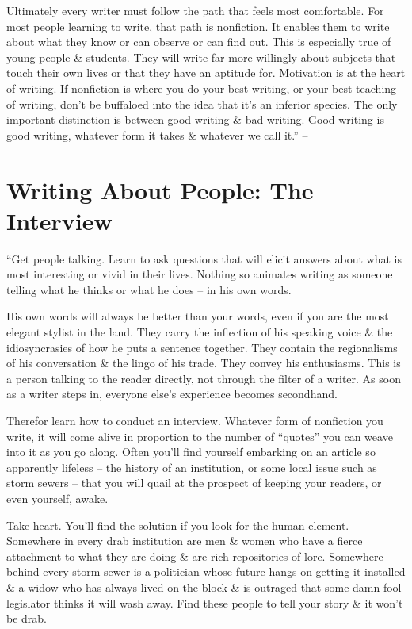 \documentclass{article}
\begin{document}
Ultimately every writer must follow the path that feels most comfortable. For most people learning to write, that path is nonfiction. It enables them to write about what they know or can observe or can find out. This is especially true of young people \& students. They will write far more willingly about subjects that touch their own lives or that they have an aptitude for. Motivation is at the heart of writing. If nonfiction is where you do your best writing, or your best teaching of writing, don't be buffaloed into the idea that it's an inferior species. The only important distinction is between good writing \& bad writing. Good writing is good writing, whatever form it takes \& whatever we call it.'' -- \cite[pp. 93--96]{Zinsser2016}


\section{Writing About People: The Interview}
``Get people talking. Learn to ask questions that will elicit answers about what is most interesting or vivid in their lives. Nothing so animates writing as someone telling what he thinks or what he does -- in his own words.

His own words will always be better than your words, even if you are the most elegant stylist in the land. They carry the inflection of his speaking voice \& the idiosyncrasies of how he puts a sentence together. They contain the regionalisms of his conversation \& the lingo of his trade. They convey his enthusiasms. This is a person talking to the reader directly, not through the filter of a writer. As soon as a writer steps in, everyone else's experience becomes secondhand.

Therefor learn how to conduct an interview. Whatever form of nonfiction you write, it will come alive in proportion to the number of ``quotes'' you can weave into it as you go along. Often you'll find yourself embarking on an article so apparently lifeless -- the history of an institution, or some local issue such as storm sewers -- that you will quail at the prospect of keeping your readers, or even yourself, awake.

Take heart. You'll find the solution if you look for the human element. Somewhere in every drab institution are men \& women who have a fierce attachment to what they are doing \& are rich repositories of lore. Somewhere behind every storm sewer is a politician whose future hangs on getting it installed \& a widow who has always lived on the block \& is outraged that some damn-fool legislator thinks it will wash away. Find these people to tell your story \& it won't be drab.
\end{document}

